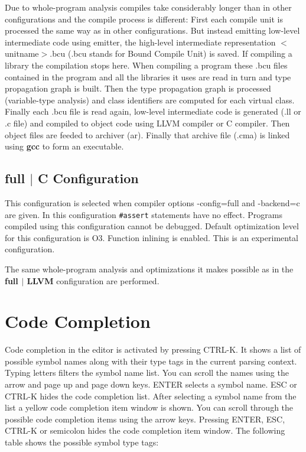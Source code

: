 \documentclass[oneside, a4paper, 11pt]{article}
\begin{document}
Due to whole-program analysis compiles take considerably longer than in other configurations and the compile process is different:
First each compile unit is processed the same way as in other configurations.
But instead emitting low-level intermediate code using emitter, the high-level intermediate representation $<$unitname$>$.bcu
(.bcu stands for Bound Compile Unit) is saved. If compiling a library the compilation stops here.
When compiling a program these .bcu files contained in the program and all the libraries it uses are read in turn
and type propagation graph is built. Then the type propagation graph is processed (variable-type analysis) and class identifiers are computed for each
virtual class. Finally each .bcu file is read again, low-level intermediate code is generated (.ll or .c file) and
compiled to object code using LLVM compiler or C compiler. Then object files are feeded to archiver (ar).
Finally that archive file (.cma) is linked using \textbf{gcc} to form an executable.

\subsection{full $|$ C Configuration}

This configuration is selected when compiler options -config=full and -backend=c are given. In this configuration \verb|#assert| statements have no effect.
Programs compiled using this configuration cannot be debugged. Default optimization level for this configuration is O3. Function inlining is enabled.
This is an experimental configuration.

The same whole-program analysis and optimizations it makes possible as in the \textbf{full $|$ LLVM} configuration are performed.

\section{Code Completion}

Code completion in the editor is activated by pressing CTRL-K.
It shows a list of possible symbol names along with their type tags in the current parsing context.
Typing letters filters the symbol name list.
You can scroll the names using the arrow and page up and page down keys.
ENTER selects a symbol name. ESC or CTRL-K hides the code completion list.
After selecting a symbol name from the list a yellow code completion item window is shown.
You can scroll through the possible code completion items using the arrow keys.
Pressing ENTER, ESC, CTRL-K or semicolon hides the code completion item window.
The following table shows the possible symbol type tags:
\end{document}
